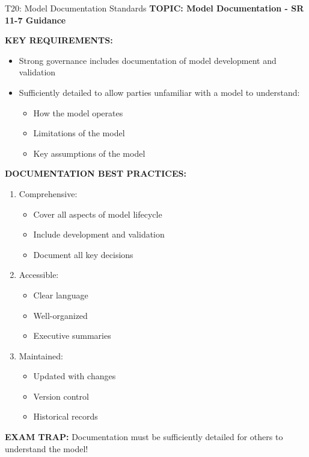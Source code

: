\documentclass[8pt]{beamer}
\begin{document}
	\begin{frame}{T20: Model Documentation Standards}
		\fontsize{6.5}{7.5}\selectfont
		\textbf{TOPIC: Model Documentation - SR 11-7 Guidance}
		
		\vspace{0.1cm}
		\textbf{KEY REQUIREMENTS:}
		\begin{itemize}
			\item Strong governance includes documentation of model development and validation
			\item Sufficiently detailed to allow parties unfamiliar with a model to understand:
			\begin{itemize}
				\item How the model operates
				\item Limitations of the model
				\item Key assumptions of the model
			\end{itemize}
		\end{itemize}
		
		\vspace{0.1cm}
		\textbf{DOCUMENTATION BEST PRACTICES:}
		\begin{enumerate}
			\item \textcolor{myblue}{Comprehensive:}
			\begin{itemize}
				\item Cover all aspects of model lifecycle
				\item Include development and validation
				\item Document all key decisions
			\end{itemize}
			\item \textcolor{myblue}{Accessible:}
			\begin{itemize}
				\item Clear language
				\item Well-organized
				\item Executive summaries
			\end{itemize}
			\item \textcolor{myblue}{Maintained:}
			\begin{itemize}
				\item Updated with changes
				\item Version control
				\item Historical records
			\end{itemize}
		\end{enumerate}
		
		\textcolor{myred}{\textbf{EXAM TRAP:}} Documentation must be \textcolor{myblue}{sufficiently detailed for others to understand the model}!
	\end{frame}
	
\end{document}
